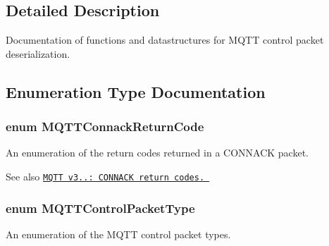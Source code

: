 \subsection{Detailed Description}
Documentation of functions and datastructures for M\+Q\+TT control packet deserialization. 



\subsection{Enumeration Type Documentation}
\subsubsection[{\texorpdfstring{M\+Q\+T\+T\+Connack\+Return\+Code}{MQTTConnackReturnCode}}]{\setlength{\rightskip}{0pt plus 5cm}enum {\bf M\+Q\+T\+T\+Connack\+Return\+Code}}\hypertarget{group__unpackers_ga07e480dfa5738e60c54ad0447ddb1a25}{}\label{group__unpackers_ga07e480dfa5738e60c54ad0447ddb1a25}


An enumeration of the return codes returned in a C\+O\+N\+N\+A\+CK packet. 

\begin{DoxySeeAlso}{See also}
\href{http://docs.oasis-open.org/mqtt/mqtt/v3.1.1/os/mqtt-v3.1.1-os.html#_Table_3.1_-}{\tt M\+Q\+TT v3..\+: C\+O\+N\+N\+A\+CK return codes. } 
\end{DoxySeeAlso}
\subsubsection[{\texorpdfstring{M\+Q\+T\+T\+Control\+Packet\+Type}{MQTTControlPacketType}}]{\setlength{\rightskip}{0pt plus 5cm}enum {\bf M\+Q\+T\+T\+Control\+Packet\+Type}}\hypertarget{group__unpackers_gacbd36b88ec7f62bc161b07e1a0aed679}{}\label{group__unpackers_gacbd36b88ec7f62bc161b07e1a0aed679}


An enumeration of the M\+Q\+TT control packet types. 

